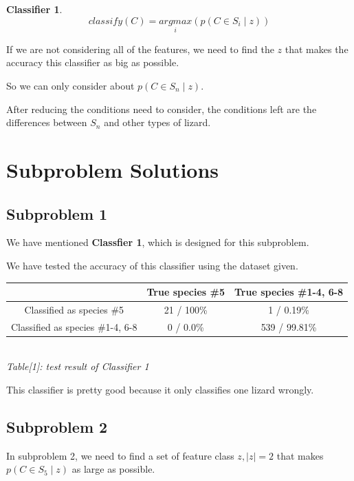 \documentclass[12pt]{article}
\newtheorem{classifier}{Classifier}
\begin{document}
		\begin{classifier}
			$$classify(C) = \underset{i}{argmax}(p(C \in S_i \mid z))$$
		\end{classifier}
		
		If we are not considering all of the features, we need to find the $z$ that
		makes the accuracy this classifier as big as possible.
		
		So we can only consider about $p(C \in S_n \mid z)$.
		
		After reducing the conditions need to consider, the conditions left are 
		the differences between $S_n$ and other types of lizard.
	
	\newpage
	\section{Subproblem Solutions}
		\subsection{Subproblem 1}
		
			We have mentioned \textbf{Classfier 1}, which is designed for this
			subproblem.
				
			We have tested the accuracy of this classifier using the dataset given.
				
			\begin{center}
				\begin{tabular}{| c | c | c |}
				\hline
				& True species \#5 & True species \#1-4, 6-8 \\
				\hline
				Classified as species \#5 & 21 / 100\% & 1 / 0.19\% \\
				\hline
				Classified as species \#1-4, 6-8 & 0 / 0.0\% & 539 / 99.81\% \\
				\hline
				\end{tabular} \\
				\vspace{3mm}
				\textit{Table[1]: test result of Classifier 1}
			\end{center}
			
			This classifier is pretty good because it only classifies one lizard
			wrongly.
		
		\subsection{Subproblem 2}
			
			In subproblem 2, we need to find a set of feature class $z, |z|=2$ that makes
			$p(C \in S_5 \mid z)$ as large as possible.
			
\end{document}

